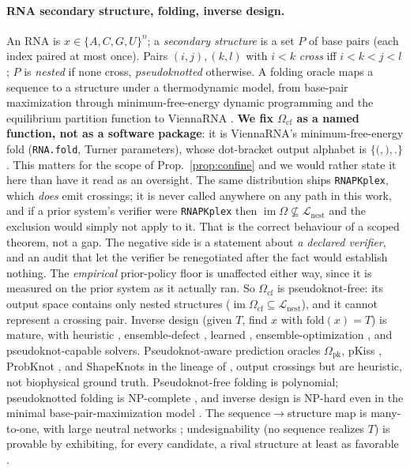 \documentclass[11pt]{article}
\newcommand{\NESTED}{\ensuremath{\mathcal{L}_{\mathrm{nest}}}}
\newcommand{\Ocf}{\ensuremath{\Omega_{\mathrm{cf}}}}
\newcommand{\Opk}{\ensuremath{\Omega_{\mathrm{pk}}}}
\begin{document}
\paragraph{RNA secondary structure, folding, inverse design.} An RNA is $x\in\{A,C,G,U\}^n$; a
\emph{secondary structure} is a set $P$ of base pairs (each index paired at most once). Pairs
$(i,j),(k,l)$ with $i<k$ \emph{cross} iff $i<k<j<l$; $P$ is \emph{nested} if none cross,
\emph{pseudoknotted} otherwise. A folding oracle maps a sequence to a structure under a thermodynamic model,
from base-pair maximization \citep{nussinov1980} through minimum-free-energy dynamic programming
\citep{zuker1981} and the equilibrium partition function \citep{mccaskill1990} to ViennaRNA
\citep{lorenz2011}. \textbf{We fix \Ocf{} as a named function, not as a software package}: it is
ViennaRNA's minimum-free-energy fold (\texttt{RNA.fold}, Turner parameters), whose dot-bracket output
alphabet is $\{\texttt{(},\texttt{)},\texttt{.}\}$. This matters for the scope of Prop.~\ref{prop:confine} and
we would rather state it here than have it read as an oversight. The same distribution ships
\texttt{RNAPKplex}, which \emph{does} emit crossings; it is never called anywhere on any path in this work,
and if a prior system's verifier were \texttt{RNAPKplex} then $\operatorname{im}\Omega\not\subseteq\NESTED$
and the exclusion would simply not apply to it. That is the correct behaviour of a scoped theorem, not a gap. The negative side is a statement about \emph{a declared verifier}, and an audit that let the verifier be
renegotiated after the fact would establish nothing. The \emph{empirical} prior-policy floor is unaffected
either way, since it is measured on the prior system as it actually ran. So \Ocf{} is pseudoknot-free: its
output space contains only nested structures ($\operatorname{im}\Ocf\subseteq\NESTED$), and it cannot represent a
crossing pair. Inverse design (given $T$, find $x$ with $\mathrm{fold}(x)=T$) is mature, with heuristic
\citep{busch2006inforna}, ensemble-defect \citep{zadeh2011nupack}, learned \citep{runge2019learna},
ensemble-optimization \citep{zhou2023samfeo}, and pseudoknot-capable \citep{wirecki2025desirna}
solvers. Pseudoknot-aware prediction oracles \Opk{}, pKiss \citep{janssen2015pkiss}, ProbKnot
\citep{bellaousov2010probknot}, and ShapeKnots \citep{hajdin2013shapeknots} in the lineage of
\citep{rivas1999pknots}, output crossings but are heuristic, not biophysical ground truth.
Pseudoknot-free folding is polynomial; pseudoknotted folding is NP-complete
\citep{lyngso2000pknot}, and inverse design is NP-hard even in the minimal
base-pair-maximization model \citep{bonnet2020hard}. The sequence$\to$structure map is many-to-one, with large
neutral networks \citep{schuster1994,aguirre2011}; undesignability (no sequence realizes $T$) is provable by
exhibiting, for every candidate, a rival structure at least as favorable \citep{zhou2024rigende,zhou2025motifs}.
\end{document}
